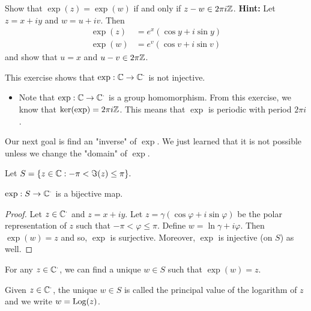 \documentclass[a4paper]{report}
\begin{document}
\begin{prop}
   Show that \( \exp(z) = \exp(w) \) if and only if \( z - w \in 2 \pi i \mathbb{Z}  \). 
   \textbf{Hint:} Let \( z = x + iy \) and \( w = u + i v \). Then 
   \begin{align*}
       \exp(z) &= e^{x} (\cos y + i \sin y) \\
       \exp(w) &= e^{v} (\cos v + i \sin v)
   \end{align*}
   and show that \( u  = x  \) and \(  u - v \in 2 \pi \mathbb{Z}  \).
\end{prop} 

\begin{remark}
    This exercise shows that \( \exp: \mathbb{C} \to \mathbb{C}^{\cdot} \) is not injective.
    \begin{itemize}
        \item Note that \( \exp: \mathbb{C} \to \mathbb{C}^{\cdot} \) is a group homomorphism. From this exercise, we know that \( \ker(\exp) = 2\pi i \mathbb{Z}  \). This means that \( \exp  \) is periodic with period \( 2 \pi i  \). 
    \end{itemize}
\end{remark}

Our next goal is find an "inverse" of \( \exp \). We just learned that it is not possible unless we change the "domain" of \( \exp \).

Let \( S = \{ z \in \mathbb{C} : -\pi < \Im(z) \leq \pi \}. \)

\begin{lemma}
   \( \exp: S \to \mathbb{C}^{\cdot} \) is a bijective map. 
\end{lemma}
\begin{proof}
Let \( z \in \mathbb{C}^{\cdot} \) and \( z = x + iy \). Let \( z = \gamma (\cos \varphi + i \sin \varphi) \) be the polar representation of \( z  \) such that \( -\pi < \varphi \leq \pi \). Define \( w = \ln \gamma + i \varphi \). Then \( \exp(w) = z  \) and so, \( \exp  \) is surjective. Moreover, \( \exp  \) is injective (on \( S \)) as well.
\end{proof}

\begin{corollary}
    For any \( z \in \mathbb{C}^{\cdot} \), we can find a unique \( w \in S  \) such that \( \exp(w) = z \).
\end{corollary}

\begin{definition}[ ]
    Given \( z \in \mathbb{C}^{\cdot} \), the unique \( w \in S  \) is called the principal value of the logarithm of \( z  \) and we write \( w = \operatorname{Log}(z) \).
\end{definition}
\end{document}
